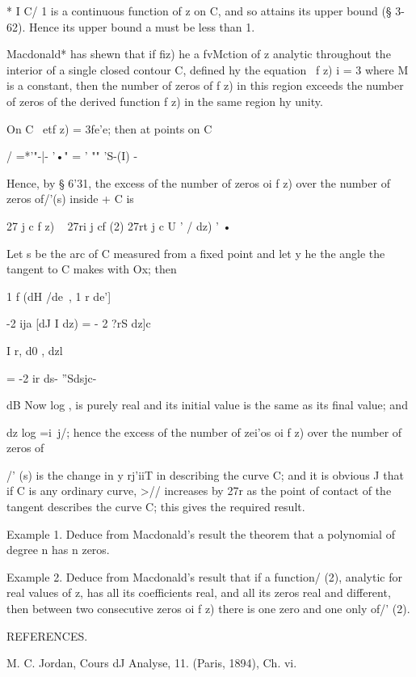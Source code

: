 * I C/ 1 is a continuous function of z on C, and so attains its upper
bound (§ 3-62). Hence its upper bound a must be less than 1.

%
%


Macdonald* has shewn that if fiz) he a fvMction of z analytic
throughout the interior of a single closed contour C, defined hy the
equation \ f z) i = 3 where M is a constant, then the number of zeros
of f z) in this region exceeds the number of zeros of the derived
function f z) in the same region hy unity.

On C \ etf z) = 3fe'e; then at points on C

/ =*'"-|- '•" = ' "" 'S-(I) -

Hence, by § 6'31, the excess of the number of zeros oi f z) over the
number of zeros of/'(s) inside + C is

27 j c f z) ~ 27ri j cf (2) 27rt j c U ' / dz) ' •

Let s be the arc of C measured from a fixed point and let y he the
angle the tangent to C makes with Ox; then

1 f (dH /de\ , 1 r de']

-2 ija [dJ I dz) = - 2 ?rS dz]c

I r, d0 , dzl

= -2 ir ds- ''Sdsjc-

dB Now log , is purely real and its initial value is the same as its
final value; and

dz log =i\ j/; hence the excess of the number of zei'os oi f z) over
the number of zeros of

/' (s) is the change in y rj'iiT in describing the curve C; and it is
obvious J that if C is any ordinary curve, >// increases by 27r as the
point of contact of the tangent describes the curve C; this gives the
required result.

Example 1. Deduce from Macdonald's result the theorem that a
polynomial of degree n has n zeros.

Example 2. Deduce from Macdonald's result that if a function/ (2),
analytic for real values of z, has all its coefficients real, and all
its zeros real and different, then between two consecutive zeros oi f
z) there is one zero and one only of/' (2).

REFERENCES.

M. C. Jordan, Cours dJ Analyse, 11. (Paris, 1894), Ch. vi.

